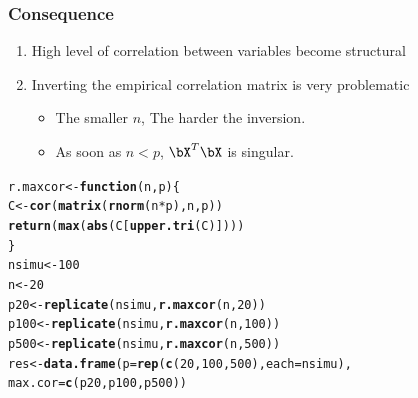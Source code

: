 \documentclass{beamer}\usepackage[]{graphicx}\usepackage[]{color}
\makeatletter
\newcommand{\hlnum}[1]{\textcolor[rgb]{0.686,0.059,0.569}{#1}}%
\newcommand{\hlopt}[1]{\textcolor[rgb]{0,0,0}{#1}}%
\newcommand{\hlstd}[1]{\textcolor[rgb]{0.345,0.345,0.345}{#1}}%
\newcommand{\hlkwa}[1]{\textcolor[rgb]{0.161,0.373,0.58}{\textbf{#1}}}%
\newcommand{\hlkwb}[1]{\textcolor[rgb]{0.69,0.353,0.396}{#1}}%
\newcommand{\hlkwc}[1]{\textcolor[rgb]{0.333,0.667,0.333}{#1}}%
\newcommand{\hlkwd}[1]{\textcolor[rgb]{0.737,0.353,0.396}{\textbf{#1}}}%
\newenvironment{kframe}{%
 \def\at@end@of@kframe{}%
 \ifinner\ifhmode%
  \def\at@end@of@kframe{\end{minipage}}%
  \begin{minipage}{\columnwidth}%
 \fi\fi%
 \def\FrameCommand##1{\hskip\@totalleftmargin \hskip-\fboxsep
 \colorbox{shadecolor}{##1}\hskip-\fboxsep
     \hskip-\linewidth \hskip-\@totalleftmargin \hskip\columnwidth}%
 \MakeFramed {\advance\hsize-\width
   \@totalleftmargin\z@ \linewidth\hsize
   \@setminipage}}%
 {\par\unskip\endMakeFramed%
 \at@end@of@kframe}
\newenvironment{knitrout}{}{} %
\makeatother
\begin{document}
\begin{frame}
  \frametitle{Consequence}

  \begin{enumerate}
  \item High level of correlation between variables become structural
  \item Inverting the empirical correlation matrix is very problematic
    \begin{itemize}
    \item The smaller $n$, The harder the inversion.
    \item As soon as $n<p$, $\bX^T\bX$ is singular.
    \end{itemize}
  \end{enumerate}



\begin{knitrout}\scriptsize
{}\color{fgcolor}\begin{kframe}
\begin{alltt}
\hlstd{r.maxcor} \hlkwb{<-} \hlkwa{function}\hlstd{(}\hlkwc{n}\hlstd{,}\hlkwc{p}\hlstd{) \{}
  \hlstd{C} \hlkwb{<-} \hlkwd{cor}\hlstd{(}\hlkwd{matrix}\hlstd{(}\hlkwd{rnorm}\hlstd{(n}\hlopt{*}\hlstd{p),n,p))}
  \hlkwd{return}\hlstd{(}\hlkwd{max}\hlstd{(}\hlkwd{abs}\hlstd{(C[}\hlkwd{upper.tri}\hlstd{(C)])))}
\hlstd{\}}
\hlstd{nsimu} \hlkwb{<-} \hlnum{100}
\hlstd{n} \hlkwb{<-} \hlnum{20}
\hlstd{p20}  \hlkwb{<-} \hlkwd{replicate}\hlstd{(nsimu,}\hlkwd{r.maxcor}\hlstd{(n,}\hlnum{20}\hlstd{))}
\hlstd{p100} \hlkwb{<-} \hlkwd{replicate}\hlstd{(nsimu,}\hlkwd{r.maxcor}\hlstd{(n,}\hlnum{100}\hlstd{))}
\hlstd{p500} \hlkwb{<-} \hlkwd{replicate}\hlstd{(nsimu,}\hlkwd{r.maxcor}\hlstd{(n,}\hlnum{500}\hlstd{))}
\hlstd{res} \hlkwb{<-} \hlkwd{data.frame}\hlstd{(}\hlkwc{p} \hlstd{=} \hlkwd{rep}\hlstd{(}\hlkwd{c}\hlstd{(}\hlnum{20}\hlstd{,}\hlnum{100}\hlstd{,}\hlnum{500}\hlstd{),}\hlkwc{each}\hlstd{=nsimu),}
                  \hlkwc{max.cor} \hlstd{=} \hlkwd{c}\hlstd{(p20,p100,p500))}
\end{alltt}
\end{kframe}
\end{knitrout}



\end{frame}
\end{document}
